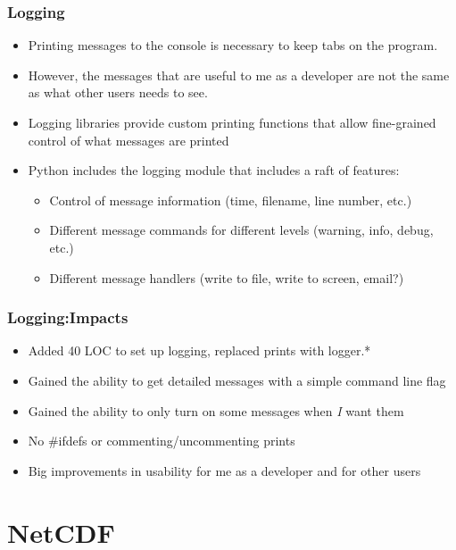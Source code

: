 \documentclass[red, hyperref={pdfpagelabels=false}]{beamer}
\begin{document}
\begin{frame}
  \frametitle{Logging}
  \begin{itemize}
    \item Printing messages to the console is necessary to keep tabs on the program.
    \item However, the messages that are useful to me as a developer are not the
      same as what other users needs to see.
    \item Logging libraries provide custom printing functions that allow fine-grained
      control of what messages are printed
    \item Python includes the logging module that includes a raft of features:
    \begin{itemize}
      \item Control of message information (time, filename, line number, etc.)
      \item Different message commands for different levels (warning, info, debug, etc.)
      \item Different message handlers (write to file, write to screen, email?)
    \end{itemize}
  \end{itemize}
\end{frame}

\begin{frame}
  \frametitle{Logging:Impacts}
  \begin{itemize}
    \item Added 40 LOC to set up logging, replaced prints with logger.*
    \item Gained the ability to get detailed messages with a simple command line flag
    \item Gained the ability to only turn on some messages when \emph{I} want them
    \item No \#ifdefs or commenting/uncommenting prints
    \item Big improvements in usability for me as a developer and for other users
  \end{itemize}
\end{frame}

\section{NetCDF}
\end{document}
